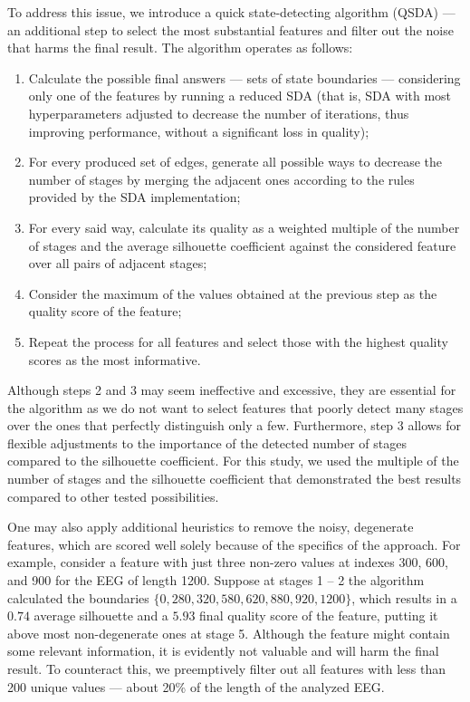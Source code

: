 \documentclass[shortAfour,times,sagev]{sagej}
\begin{document}
To address this issue, we introduce a quick state-detecting algorithm (QSDA) --- an additional step to select the most substantial features and filter out the noise that harms the final result. The algorithm operates as follows:
\begin{enumerate}
    \item 
Calculate the possible final answers --- sets of state boundaries --- considering only one of the features by running a reduced SDA (that is, SDA with most hyperparameters adjusted to decrease the number of iterations, thus improving performance, without a significant loss in quality);
    \item
For every produced set of edges, generate all possible ways to decrease the number of stages by merging the adjacent ones according to the rules provided by the SDA implementation;
    \item
For every said way, calculate its quality as a weighted multiple of the number of stages and the average silhouette coefficient against the considered feature over all pairs of adjacent stages;
    \item 
Consider the maximum of the values obtained at the previous step as the quality score of the feature;
    \item
Repeat the process for all features and select those with the highest quality scores as the most informative.
\end{enumerate}

Although steps 2 and 3 may seem ineffective and excessive, they are essential for the algorithm as we do not want to select features that poorly detect many stages over the ones that perfectly distinguish only a few. Furthermore, step 3 allows for flexible adjustments to the importance of the detected number of stages compared to the silhouette coefficient. For this study, we used the multiple of the number of stages and the silhouette coefficient that demonstrated the best results compared to other tested possibilities.

One may also apply additional heuristics to remove the noisy, degenerate features, which are scored well solely because of the specifics of the approach. For example, consider a feature with just three non-zero values at indexes 300, 600, and 900 for the EEG of length 1200. Suppose at stages 1 -- 2 the algorithm calculated the boundaries $\{ 0, 280, 320, 580, 620, 880, 920, 1200 \}$, which results in a $0.74$ average silhouette and a $5.93$ final quality score of the feature, putting it above most non-degenerate ones at stage 5. Although the feature might contain some relevant information, it is evidently not valuable and will harm the final result. To counteract this, we preemptively filter out all features with less than 200 unique values --- about 20\% of the length of the analyzed EEG.\@
\end{document}
